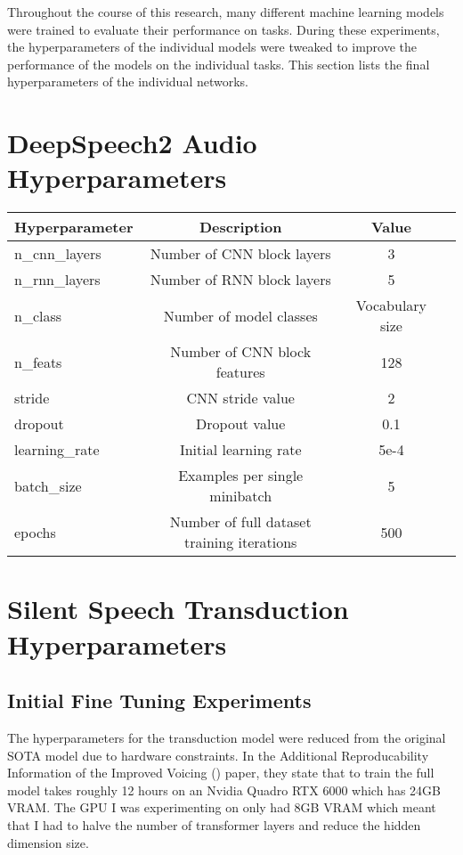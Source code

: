 Throughout the course of this research, many different machine learning models were
trained to evaluate their performance on tasks. During these experiments,
the hyperparameters of the individual models were tweaked to improve the performance of
the models on the individual tasks. This section lists the final hyperparameters of
the individual networks.

\section{DeepSpeech2 Audio Hyperparameters}


{\small\begin{center}
\begin{tabular} { | l | c | c | c | }
\hline
Hyperparameter & Description & Value \\
\hline
n\_cnn\_layers & Number of CNN block layers & 3 \\
n\_rnn\_layers & Number of RNN block layers & 5 \\
n\_class & Number of model classes & Vocabulary size \\
n\_feats & Number of CNN block features & 128 \\
stride & CNN stride value & 2 \\
dropout & Dropout value & 0.1 \\
learning\_rate & Initial learning rate & 5e-4 \\
batch\_size & Examples per single minibatch & 5 \\
epochs & Number of full dataset training iterations & 500 \\
\hline
\end{tabular}
\end{center}}

\section{Silent Speech Transduction Hyperparameters}

\subsection{Initial Fine Tuning Experiments}

The hyperparameters for the transduction model were reduced from the original
SOTA model due to hardware constraints. In the Additional Reproducability
Information of the Improved Voicing (\cite{gaddy2021improved}) paper, they state
that to train the full model takes roughly 12 hours on an Nvidia Quadro RTX 6000
which has 24GB VRAM. The GPU I was experimenting on only had 8GB VRAM which meant
that I had to halve the number of transformer layers and reduce the hidden dimension
size.


